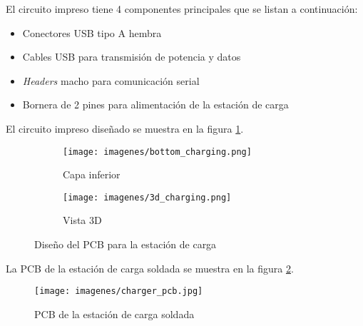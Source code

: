 El circuito impreso tiene 4 componentes principales que se listan a continuación:

\begin{itemize}
    \item Conectores USB tipo A hembra
    \item Cables USB para transmisión de potencia y datos
    \item \textit{Headers} macho para comunicación serial
    \item Bornera de 2 pines para alimentación de la estación de carga
\end{itemize}
El circuito impreso diseñado se muestra en la figura \ref{fig:pcb_estacion_carga}.

\begin{figure}[H]
    \centering
    \begin{subfigure}{0.9\linewidth}
        \centering
        \texttt{[image: imagenes/bottom\_charging.png]}
        \caption{Capa inferior}
    \end{subfigure}
    \vfill
    \begin{subfigure}{0.9\linewidth}
        \centering
        \texttt{[image: imagenes/3d\_charging.png]}
        \caption{Vista 3D}
    \end{subfigure}
    \caption{Diseño del PCB para la estación de carga}
    \label{fig:pcb_estacion_carga}
\end{figure}

La PCB de la estación de carga soldada se muestra en la figura \ref{fig:pcb_estacion_carga_soldada}.

\begin{figure}[H]
    \centering
    \texttt{[image: imagenes/charger\_pcb.jpg]}
    \caption{PCB de la estación de carga soldada}
    \label{fig:pcb_estacion_carga_soldada}
\end{figure}